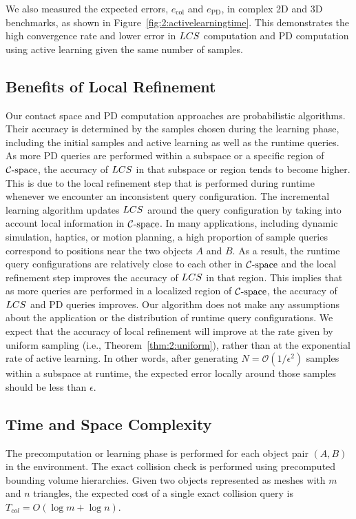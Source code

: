 We also measured the expected errors, $e_{\text{col}}$ and $e_{\text{PD}}$, in
complex 2D and 3D benchmarks, as shown in Figure~\ref{fig:2:activelearningtime}.
This demonstrates the high convergence rate and lower error in $LCS$ computation and PD computation using active learning given the same number
of samples.

\subsection{Benefits of Local Refinement}
Our contact space and PD computation approaches are probabilistic algorithms. Their accuracy is determined by
the samples chosen during the learning phase, including the initial samples and active learning as well as
the runtime queries. As more PD queries are performed within a subspace or a specific region of $\mathcal C\text{-space}$,
the accuracy of $LCS$ in that subspace or region tends to become higher.
This is due to the local refinement step that is performed during runtime whenever we encounter an
inconsistent query configuration.
The incremental learning algorithm updates $LCS$ around the query configuration by taking into account
local information in $\mathcal C\text{-space}$.
In many applications, including dynamic simulation, haptics, or motion planning, a high proportion of
sample queries correspond to positions near the two objects $A$ and $B$. As a result, the runtime
query configurations are relatively close to each other in $\mathcal C\text{-space}$ and the local refinement
step improves the accuracy of $LCS$ in that region. This implies that as more queries are performed in
a localized region of $\mathcal C\text{-space}$, the accuracy of $LCS$ and PD queries improves.
Our algorithm does not make any assumptions about the application or the distribution of runtime query
configurations. We expect that the accuracy of local refinement will improve at the rate given by
uniform sampling (i.e., Theorem~\ref{thm:2:uniform}), rather than at the exponential rate of active learning.
In other words, after generating $N = \mathcal O(1/\epsilon^2)$ samples within a subspace at runtime,
the expected error locally around those samples should be less than $\epsilon$.


\subsection{Time and Space Complexity}
\label{sec:2:analysis:timespacecomplexity}
The precomputation or learning phase is performed for each object pair $(A, B)$
in the environment. The exact collision check is performed using precomputed bounding volume hierarchies.
Given two objects represented as meshes with $m$ and $n$ triangles, the expected cost of a single
exact collision query is $T_{col} = O(\log m + \log n)$.

